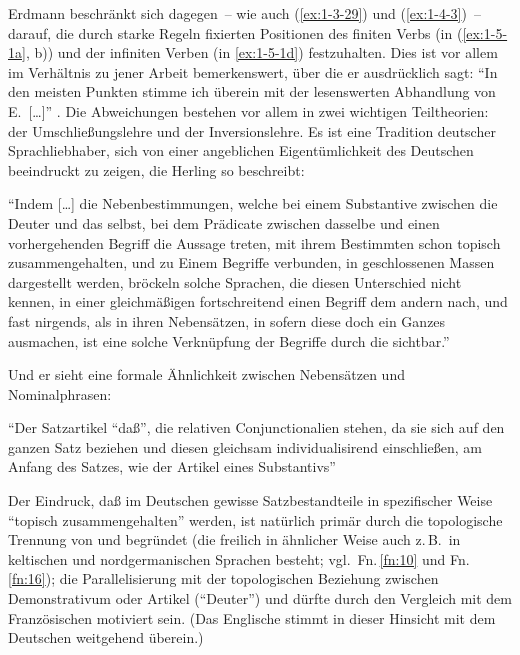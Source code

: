 \documentclass[output=paper]{langsci/langscibook}
\begin{document}
\largerpage
Erdmann beschränkt sich dagegen~-- wie auch (\ref{ex:1-3-29}) und (\ref{ex:1-4-3})~-- darauf, die durch
starke Regeln fixierten Positionen des finiten Verbs (in (\ref{ex:1-5-1a}, b)) und der infiniten Verben (in \ref{ex:1-5-1d}) festzuhalten. Dies ist vor allem im Verhältnis zu jener Arbeit bemerkenswert, über die er ausdrücklich sagt: "`In den meisten Punkten stimme ich überein mit der lesenswerten Abhandlung von E.\,  [\ldots]"' \citep[182]{Erdmann1886}. Die Abweichungen bestehen vor allem in zwei wichtigen Teiltheorien: der Umschließungslehre
und der Inversionslehre.
\ssubsection{}%
\label{subsec:1-5.3}
Es ist eine Tradition deutscher Sprachliebhaber, sich von einer angeblichen Eigentümlichkeit des
Deutschen beeindruckt zu zeigen, die Herling so beschreibt:

\begin{exe}
\ex\label{ex:1-5-4}
"`Indem [\ldots] die Nebenbestimmungen, welche bei einem Substantive zwischen die Deuter und das  selbst, bei dem Prädicate zwischen
dasselbe und einen vorhergehenden Begriff \zb die Aussage treten, mit
ihrem Bestimmten schon topisch zusammengehalten, und zu Einem Begriffe
verbunden, in geschlossenen Massen dargestellt werden, bröckeln solche
Sprachen, die diesen Unterschied nicht kennen, in einer gleichmäßigen
 fortschreitend einen Begriff dem andern nach, und fast nirgends,
als in ihren Nebensätzen, in sofern diese doch ein Ganzes ausmachen, ist eine solche Verknüpfung der Begriffe durch die  sichtbar."' \citep[302]{Herling1821T}
\end{exe}
Und er sieht eine formale Ähnlichkeit zwischen Nebensätzen und Nominalphrasen:
\begin{exe}
\ex\label{ex:1-5-5}
"`Der Satzartikel "`daß"', die relativen Conjunctionalien stehen, da sie sich auf
den ganzen Satz beziehen und diesen gleichsam individualisirend einschließen, am Anfang des Satzes, wie der Artikel eines Substantivs"' \citep[89]{Herling1830}
\end{exe}
Der Eindruck, daß im Deutschen gewisse Satzbestandteile in spezifischer Weise "`topisch zusammengehalten"' werden, ist natürlich primär durch die topologische Trennung von  und  begründet (die freilich in ähnlicher Weise
auch z.\,B.\ in keltischen und nordgermanischen Sprachen besteht; vgl.\ Fn.\,\ref{fn:10} und Fn.\,\ref{fn:16}); die Parallelisierung mit der topologischen Beziehung zwischen Demonstrativum
oder Artikel ("`Deuter"') und  dürfte durch den Vergleich mit dem Französischen motiviert sein. (Das Englische stimmt in dieser Hinsicht mit dem Deutschen
weitgehend überein.)
\end{document}
